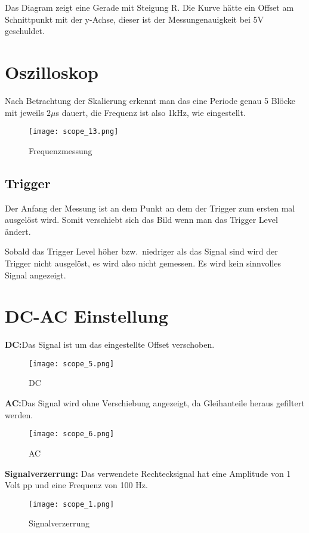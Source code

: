 \documentclass[10pt]{report}
\begin{document}
        \noindent Das Diagram zeigt eine Gerade mit Steigung R. Die Kurve hätte ein Offset am
        Schnittpunkt mit der y-Achse, dieser ist der Messungenauigkeit bei 5V
        geschuldet.

        \section{Oszilloskop}
        Nach Betrachtung der Skalierung erkennt man das eine Periode genau 5 Blöcke
        mit jeweils $2 \mu$s dauert, die Frequenz ist also 1kHz, wie eingestellt.
        \begin{figure}
         \texttt{[image: scope\_13.png]}
         \caption{Frequenzmessung}
       \end{figure}

       \subsection{Trigger}

        Der Anfang der Messung ist an dem Punkt an dem der Trigger zum ersten mal
        ausgelöst wird. Somit verschiebt sich das Bild wenn man das Trigger Level
        ändert.

         \noindent Sobald das Trigger Level höher bzw.\ niedriger als das Signal sind wird
         der Trigger nicht ausgelöst, es wird also nicht gemessen. Es wird kein sinnvolles
         Signal angezeigt.

         \section{DC-AC Einstellung}
         \textbf{DC:}\@ Das Signal ist um das eingestellte Offset verschoben.
         \begin{figure}
          \texttt{[image: scope\_5.png]}
          \caption{DC}
        \end{figure}

         \noindent \textbf{AC:}\@ Das Signal wird ohne Verschiebung angezeigt, da Gleihanteile heraus
         gefiltert werden.
         \begin{figure}
          \texttt{[image: scope\_6.png]}
          \caption{AC}
        \end{figure}

         \noindent \textbf{Signalverzerrung:} Das verwendete Rechtecksignal hat eine Amplitude von 1 Volt pp
         und eine Frequenz von 100 Hz.
         \begin{figure}
          \texttt{[image: scope\_1.png]}
          \caption{Signalverzerrung}
        \end{figure}
\end{document}
